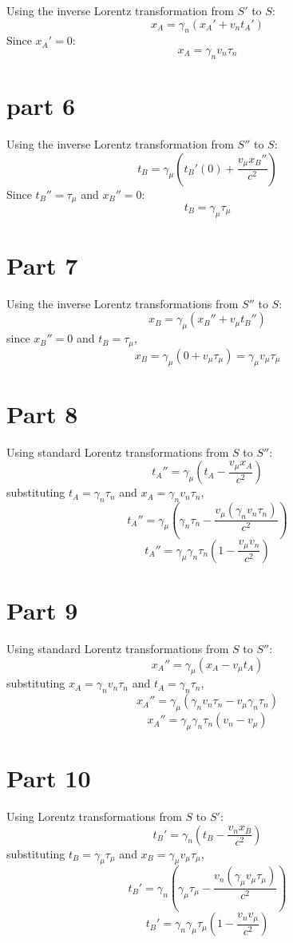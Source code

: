 \documentclass{article}
\begin{document}
Using the inverse Lorentz transformation from $S'$ to $S$:
$$x_A = \gamma_n (x_A' + v_n t_A')$$ 
Since $x_A' = 0$:
$$x_A = \gamma_n v_n \tau_n$$

\section{part 6}
Using the inverse Lorentz transformation from $S''$ to $S$:
$$t_B = \gamma_\mu (t_B'(0) + \frac{v_\mu x_B''}{c^2})$$
Since $t_B'' = \tau_\mu$ and $x_B'' = 0$:
$$t_B = \gamma_\mu \tau_\mu$$

\section{Part 7}
Using the inverse Lorentz transformations from $S''$ to $S$:
$$x_B = \gamma_\mu (x_B'' + v_\mu t_B'')$$
since $x_B'' = 0$ and $t_B = \tau_\mu$,
$$x_B = \gamma_\mu (0 + v_\mu \tau_\mu) = \gamma_\mu v_\mu \tau_\mu$$

\section{Part 8}
Using standard Lorentz transformations from $S$ to $S''$:
$$t_A'' = \gamma_\mu \left( t_A - \frac{v_\mu x_A}{c^2} \right)$$
substituting $t_A = \gamma_n \tau_n$ and $x_A = \gamma_n v_n \tau_n$,
$$t_A'' = \gamma_\mu \left( \gamma_n \tau_n - \frac{v_\mu (\gamma_n v_n \tau_n)}{c^2} \right)$$  
$$t_A'' = \gamma_\mu \gamma_n \tau_n \left( 1 - \frac{v_\mu v_n}{c^2} \right)$$

\section{Part 9}
Using standard Lorentz transformations from $S$ to $S''$:
$$x_A'' = \gamma_\mu (x_A - v_\mu t_A)$$
substituting  $x_A = \gamma_n v_n \tau_n$ and $t_A = \gamma_n \tau_n$,
$$x_A'' = \gamma_\mu (\gamma_n v_n \tau_n - v_\mu \gamma_n \tau_n)$$
$$x_A'' = \gamma_\mu \gamma_n \tau_n (v_n - v_\mu)$$

\section{Part 10}
Using Lorentz transformations from $S$ to $S'$:
$$t_B' = \gamma_n \left( t_B - \frac{v_n x_B}{c^2} \right)$$
substituting $t_B = \gamma_\mu \tau_\mu$ and $x_B = \gamma_\mu v_\mu \tau_\mu$,
$$t_B' = \gamma_n \left( \gamma_\mu \tau_\mu - \frac{v_n (\gamma_\mu v_\mu \tau_\mu)}{c^2} \right)$$  
$$t_B' = \gamma_n \gamma_\mu \tau_\mu \left( 1 - \frac{v_n v_\mu}{c^2} \right)$$
\end{document}
